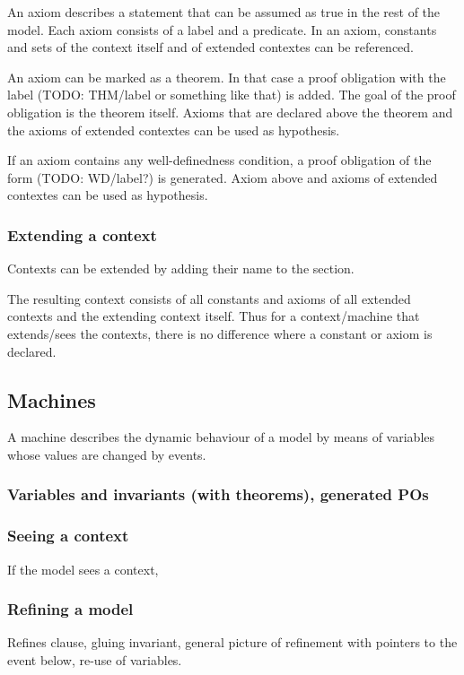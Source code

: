 An axiom describes a statement that can be assumed as true in the rest of the model.
Each axiom consists of a label and a predicate.
In an axiom, constants and sets of the context itself and of extended contextes can be referenced.

An axiom can be marked as a theorem. In that case a proof obligation with the label (TODO: THM/label or something like that) is added.
The goal of the proof obligation is the theorem itself.
Axioms that are declared above the theorem and the axioms of extended contextes can be used as hypothesis.

If an axiom contains any well-definedness condition, a proof obligation of the form (TODO: WD/label?) is generated.
Axiom above and axioms of extended contextes can be used as hypothesis.
   
\subsubsection{Extending a context}
Contexts can be extended by adding their name to the  section.

The resulting context consists of all constants and axioms of all extended contexts and the extending context itself.
Thus for a context/machine that extends/sees the contexts, there is no difference where a constant or axiom is declared.

\subsection{Machines}
A machine describes the dynamic behaviour of a model by means of variables whose values are changed by events.

\subsubsection{Variables and invariants (with theorems), generated POs}

\subsubsection{Seeing a context}
If the model sees a context, 

\subsubsection{Refining a model}

Refines clause, gluing invariant, general picture of refinement with pointers to the event below, re-use of variables.

